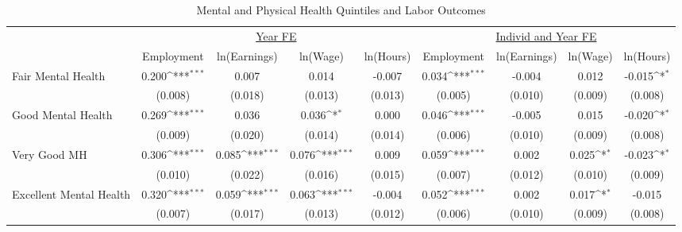 \documentclass[border=3mm,preview]{standalone}
\begin{document}
\begin{landscape}
\def\sym#1{\ifmmode^{#1}\else\(^{#1}\)\fi}
\begin{table}
\center\caption*{Mental and Physical Health Quintiles and Labor Outcomes}
\footnotesize
\begin{tabular}{l*{8}{c}}
                    &\multicolumn{4}{c}{\underline{Year FE}}                                                &\multicolumn{4}{c}{\underline{Individ and Year FE}}                                    \\\cmidrule(lr){2-5}\cmidrule(lr){6-9}
                    &\multicolumn{1}{c}{Employment}&\multicolumn{1}{c}{ln(Earnings)}&\multicolumn{1}{c}{ln(Wage)}&\multicolumn{1}{c}{ln(Hours)}&\multicolumn{1}{c}{Employment}&\multicolumn{1}{c}{ln(Earnings)}&\multicolumn{1}{c}{ln(Wage)}&\multicolumn{1}{c}{ln(Hours)}\\
\toprule
Fair Mental Health  &       0.200\sym{***}&       0.007         &       0.014         &      -0.007         &       0.034\sym{***}&      -0.004         &       0.012         &      -0.015\sym{*}  \\
                    &     (0.008)         &     (0.018)         &     (0.013)         &     (0.013)         &     (0.005)         &     (0.010)         &     (0.009)         &     (0.008)         \\
Good Mental Health  &       0.269\sym{***}&       0.036         &       0.036\sym{*}  &       0.000         &       0.046\sym{***}&      -0.005         &       0.015         &      -0.020\sym{*}  \\
                    &     (0.009)         &     (0.020)         &     (0.014)         &     (0.014)         &     (0.006)         &     (0.010)         &     (0.009)         &     (0.008)         \\
Very Good MH        &       0.306\sym{***}&       0.085\sym{***}&       0.076\sym{***}&       0.009         &       0.059\sym{***}&       0.002         &       0.025\sym{*}  &      -0.023\sym{*}  \\
                    &     (0.010)         &     (0.022)         &     (0.016)         &     (0.015)         &     (0.007)         &     (0.012)         &     (0.010)         &     (0.009)         \\
Excellent Mental Health&       0.320\sym{***}&       0.059\sym{***}&       0.063\sym{***}&      -0.004         &       0.052\sym{***}&       0.002         &       0.017\sym{*}  &      -0.015         \\
                    &     (0.007)         &     (0.017)         &     (0.013)         &     (0.012)         &     (0.006)         &     (0.010)         &     (0.009)         &     (0.008)         \\

\end{tabular}
\end{table}
\end{landscape}
\end{document}
